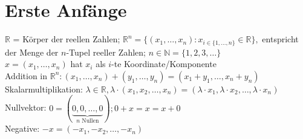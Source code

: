 \documentclass[12pt,a4paper]{article}
\theoremstyle{plain}
\newcommand{\N}{\mathbb{N}}
\newcommand{\R}{\mathbb{R}}
\numberwithin{equation}{section}
\begin{document}
\section{Erste Anfänge}
$\R$ = Körper der reellen Zahlen; $\R^n=\{(x_1,\ldots,x_n):x_{i\in \{1,\ldots,n\}}\in \R\},$ entspricht der Menge der $n$-Tupel reeller Zahlen; $ n\in \N=\{1,2,3,\ldots\}$ \\
$x=(x_1,\ldots,x_n)$ hat $x_i$ als $i$-te Koordinate/Komponente\\
Addition in $\R^n: (x_1,\ldots,x_n) + (y_1,\ldots,y_n)=(x_1+y_1,\ldots,x_n+y_n)$\\
Skalarmultiplikation: $\lambda \in \R, \lambda\cdot (x_1,x_2,\ldots,x_n)=(\lambda\cdot x_1, \lambda \cdot x_2,\ldots, \lambda\cdot x_n)$\\
Nullvektor: $0=(\underbrace{0,0,\ldots,0}_{n \text{ Nullen}}); 0+x=x=x+0$\\
Negative: $-x=(-x_1,-x_2,\ldots,-x_n)$
\end{document}
